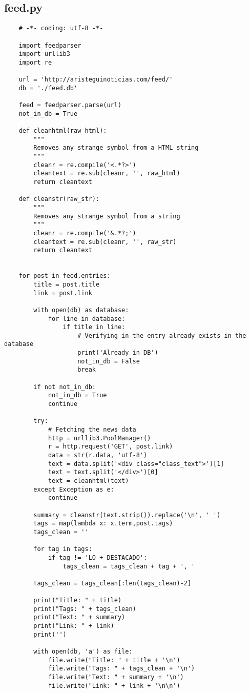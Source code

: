 \subsection{feed.py}
\label{appe:auxiliar}

\begin{verbatim}
    # -*- coding: utf-8 -*-

    import feedparser
    import urllib3
    import re

    url = 'http://aristeguinoticias.com/feed/'
    db = './feed.db'

    feed = feedparser.parse(url)
    not_in_db = True

    def cleanhtml(raw_html):
        """
        Removes any strange symbol from a HTML string
        """
        cleanr = re.compile('<.*?>')
        cleantext = re.sub(cleanr, '', raw_html)
        return cleantext

    def cleanstr(raw_str):
        """
        Removes any strange symbol from a string
        """
        cleanr = re.compile('&.*?;')
        cleantext = re.sub(cleanr, '', raw_str)
        return cleantext


    for post in feed.entries:
        title = post.title
        link = post.link

        with open(db) as database:
            for line in database:
                if title in line:
                    # Verifying in the entry already exists in the database
                    print('Already in DB')
                    not_in_db = False
                    break

        if not not_in_db:
            not_in_db = True
            continue

        try:
            # Fetching the news data
            http = urllib3.PoolManager()
            r = http.request('GET', post.link)
            data = str(r.data, 'utf-8')
            text = data.split('<div class="class_text">')[1]
            text = text.split('</div>')[0]
            text = cleanhtml(text)
        except Exception as e:
            continue

        summary = cleanstr(text.strip()).replace('\n', ' ')
        tags = map(lambda x: x.term,post.tags)
        tags_clean = ''

        for tag in tags:
            if tag != 'LO + DESTACADO':
                tags_clean = tags_clean + tag + ', '

        tags_clean = tags_clean[:len(tags_clean)-2]

        print("Title: " + title)
        print("Tags: " + tags_clean)
        print("Text: " + summary)
        print("Link: " + link)
        print('')

        with open(db, 'a') as file:
            file.write("Title: " + title + '\n')
            file.write("Tags: " + tags_clean + '\n')
            file.write("Text: " + summary + '\n')
            file.write("Link: " + link + '\n\n')

\end{verbatim}


